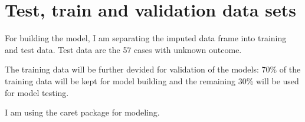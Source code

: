 \documentclass[]{book}
\newenvironment{Shaded}{\begin{snugshade}}{\end{snugshade}}
\newcommand{\CharTok}[1]{\textcolor[rgb]{0.31,0.60,0.02}{#1}}
\newcommand{\CommentTok}[1]{\textcolor[rgb]{0.56,0.35,0.01}{\textit{#1}}}
\newcommand{\KeywordTok}[1]{\textcolor[rgb]{0.13,0.29,0.53}{\textbf{#1}}}
\newcommand{\NormalTok}[1]{#1}
\newcommand{\OperatorTok}[1]{\textcolor[rgb]{0.81,0.36,0.00}{\textbf{#1}}}
\newcommand{\StringTok}[1]{\textcolor[rgb]{0.31,0.60,0.02}{#1}}
\begin{document}
\begin{Shaded}
\end{Shaded}

\begin{Shaded}
\end{Shaded}

\hypertarget{test-train-and-validation-data-sets}{%
\section{Test, train and validation data sets}\label{test-train-and-validation-data-sets}}

For building the model, I am separating the imputed data frame into training and test data. Test data are the 57 cases with unknown outcome.

The training data will be further devided for validation of the models: 70\% of the training data will be kept for model building and the remaining 30\% will be used for model testing.

I am using the caret package for modeling.
\end{document}
